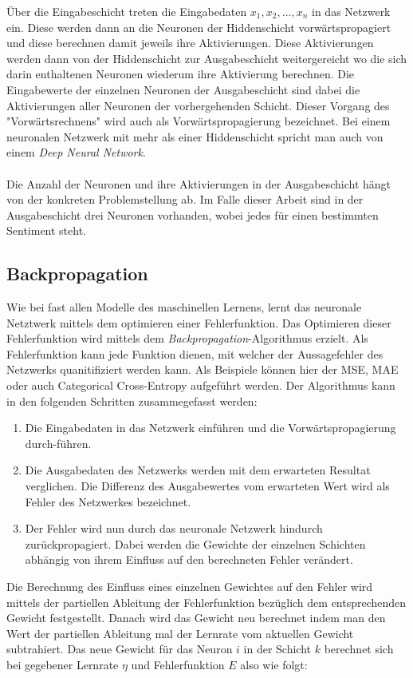 Über die Eingabeschicht treten die Eingabedaten $x_1, x_2, ..., x_n$ in das Netzwerk ein. Diese werden dann an die Neuronen der Hiddenschicht vorwärtspropagiert und diese berechnen damit jeweils ihre Aktivierungen. Diese Aktivierungen werden dann von der Hiddenschicht zur Ausgabeschicht weitergereicht wo die sich darin enthaltenen Neuronen wiederum ihre Aktivierung berechnen. Die Eingabewerte der einzelnen Neuronen der Ausgabeschicht sind dabei die Aktivierungen aller Neuronen der vorhergehenden Schicht. Dieser Vorgang des "Vorwärtsrechnens" wird auch als Vorwärtspropagierung bezeichnet. Bei einem neuronalen Netzwerk mit mehr als einer Hiddenschicht spricht man auch von einem \emph{Deep Neural Network}.\\\\
Die Anzahl der Neuronen und ihre Aktivierungen in der Ausgabeschicht hängt von der konkreten Problemstellung ab. Im Falle dieser Arbeit sind in der Ausgabeschicht drei Neuronen vorhanden, wobei jedes für einen bestimmten Sentiment steht.

\subsection{Backpropagation}
Wie bei fast allen Modelle des maschinellen Lernens, lernt das neuronale Netztwerk mittels dem optimieren einer Fehlerfunktion. Das Optimieren dieser Fehlerfunktion wird mittels dem \emph{Backpropagation}-Algorithmus erzielt. Als Fehlerfunktion kann jede Funktion dienen, mit welcher der Aussagefehler des Netzwerks quanitifiziert werden kann. Als Beispiele können hier der MSE, MAE oder auch Categorical Cross-Entropy aufgeführt werden. Der Algorithmus kann in den folgenden Schritten zusammegefasst werden:
\begin{enumerate}
	\item Die Eingabedaten in das Netzwerk einführen und die Vorwärtspropagierung durch-führen.
	\item Die Ausgabedaten des Netzwerks werden mit dem erwarteten Resultat verglichen. Die Differenz des Ausgabewertes vom erwarteten Wert wird als Fehler des Netzwerkes bezeichnet.
	\item Der Fehler wird nun durch das neuronale Netzwerk hindurch zurückpropagiert. Dabei werden die Gewichte der einzelnen Schichten abhängig von ihrem Einfluss auf den berechneten Fehler verändert.
\end{enumerate}

Die Berechnung des Einfluss eines einzelnen Gewichtes auf den Fehler wird mittels der partiellen Ableitung der Fehlerfunktion bezüglich dem entsprechenden Gewicht festgestellt. Danach wird das Gewicht neu berechnet indem man den Wert der partiellen Ableitung mal der Lernrate vom aktuellen Gewicht subtrahiert. Das neue Gewicht für das Neuron $i$ in der Schicht $k$ berechnet sich bei gegebener Lernrate $\eta$ und Fehlerfunktion $E$ also wie folgt:

